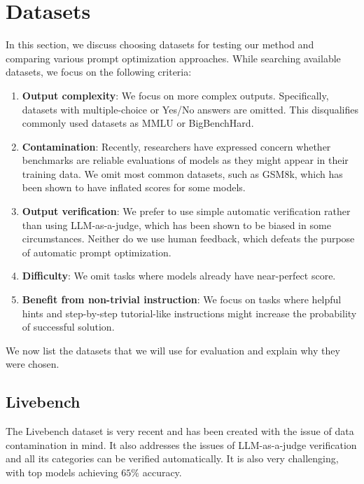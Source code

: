 \section{Datasets}
In this section, we discuss choosing datasets for testing our method and comparing various prompt optimization approaches. 
While searching available datasets, we focus on the following criteria:
\begin{enumerate}
    \item \textbf{Output complexity}: We focus on more complex outputs. Specifically, datasets with multiple-choice or Yes/No answers are omitted. 
    This disqualifies commonly used datasets as MMLU or BigBenchHard.
    \item \textbf{Contamination}: Recently, researchers have expressed concern\cite{white2025livebenchchallengingcontaminationlimitedllm} 
    whether benchmarks are reliable evaluations of models as they might appear in their training data. We omit most common datasets, such as GSM8k\cite{cobbe2021gsm8k}, which has been shown to have inflated scores for some models\cite{testing_language_models_on_a_held_out_high_school_national_finals_exam}.
    \item \textbf{Output verification}: We prefer to use simple automatic verification rather than using LLM-as-a-judge, which has been shown to be 
    biased in some circumstances\cite{ye2024justiceprejudicequantifyingbiases}. Neither do we use human feedback, which defeats the purpose of automatic prompt optimization.
    \item \textbf{Difficulty}: We omit tasks where models already have near-perfect score. 
    \item \textbf{Benefit from non-trivial instruction}: We focus on tasks where helpful hints and step-by-step tutorial-like instructions might increase the probability of successful solution.
\end{enumerate}
We now list the datasets that we will use for evaluation and explain why they were chosen.
\subsection{Livebench}
The Livebench\cite{white2025livebenchchallengingcontaminationlimitedllm} dataset is very recent and has been created with the issue of data contamination in mind.
It also addresses the issues of LLM-as-a-judge verification and all its categories can be verified automatically. It is also very challenging, with top models achieving $65\%$ accuracy\cite{white2025livebenchchallengingcontaminationlimitedllm}.

